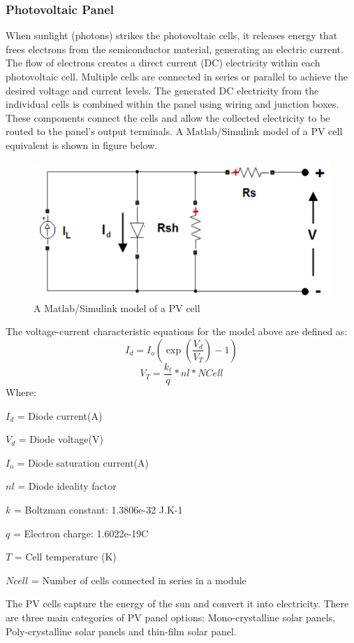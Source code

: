 \subsubsection{Photovoltaic Panel}
When sunlight (photons) strikes the photovoltaic cells, it releases energy that frees electrons from the semiconductor material, generating an electric current. The flow of electrons creates a direct current (DC) electricity within each photovoltaic cell. Multiple cells are connected in series or parallel to achieve the desired voltage and current levels. The generated DC electricity from the individual cells is combined within the panel using wiring and junction boxes. These components connect the cells and allow the collected electricity to be routed to the panel's output terminals.
A Matlab/Simulink model of a PV cell equivalent is shown in figure below.\par
\begin{figure}[H]
	\centering
	\includegraphics[totalheight=6cm]{Figures/pv cell.png}
	\caption{A Matlab/Simulink model of a PV cell}
\end{figure}
The voltage-current characteristic equations for the model above are defined as:
\begin{equation}
	{I_d}={I_o}(\exp(\frac{{V_d}}{{V_T}})-1)
\end{equation}
\begin{equation}
	{V_T}=\frac{{k_t}}{{q}}*nl*NCell
\end{equation}
Where:\par
\begin{list}{}{}
	\setlength\itemsep{-1em}
	\item ${I_d}$ = Diode current(A)
	\item ${V_d}$ = Diode voltage(V)
	\item ${I_o}$ = Diode saturation current(A)
	\item ${nl}$ = Diode ideality factor
	\item ${k}$ = Boltzman constant: 1.3806e-32 J.K-1
	\item ${q}$ = Electron charge: 1.6022e-19C
	\item ${T}$ =  Cell temperature (K)
	\item ${Ncell}$ = Number of cells connected in series in a module
\end{list}
The PV cells capture the energy of the sun and convert it into electricity. There are three main categories of PV panel options: Mono-crystalline solar panels, Poly-crystalline solar panels and thin-film solar panel.
